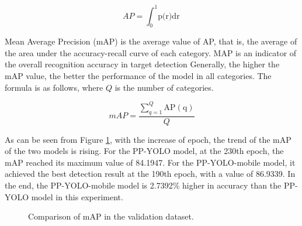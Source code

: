 \documentclass[journal,article,submit,moreauthors,pdftex]{Definitions/mdpi}
\begin{document}
\begin{equation} 
{AP} = {\int_{0}^{1}\text{p(r)dr}} 
\end{equation}

Mean Average Precision (mAP) is the average value of AP, that is, the average of the area under the accuracy-recall curve of each category. MAP is an indicator of the overall recognition accuracy in target detection Generally, the higher the mAP value, the better the performance of the model in all categories. The formula is as follows, where $Q$ is the number of categories.

\begin{equation} 
{mAP} = {\frac {\sum _{q=1}^{Q}\operatorname {AP(q)} }{Q}}
\end{equation}


As can be seen from Figure \ref{fig:map}, with the increase of epoch, the trend of the mAP of the two models is rising. For the PP-YOLO model, at the 230th epoch, the mAP reached its maximum value of 84.1947. For the PP-YOLO-mobile model, it achieved the best detection result at the 190th epoch, with a value of 86.9339. In the end, the PP-YOLO-mobile model is 2.7392\% higher in accuracy than the PP-YOLO model in this experiment.

\begin{figure}[htbp]
\centering
{}
\quad
{}
\caption{Comparison of mAP in the validation dataset.}
\label{fig:map}
\end{figure}
\end{document}
